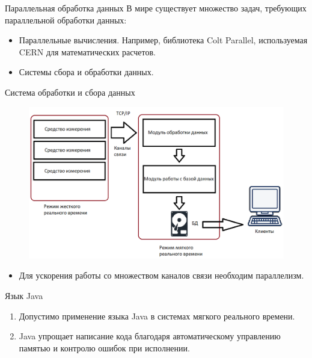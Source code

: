 
{
\begin{frame}[noframenumbering]
		\titlepage
\end{frame}
}

\begin{frame}{Параллельная обработка данных}
	В мире существует множество задач, требующих параллельной обработки данных:
	\begin{itemize}
		\item Параллельные вычисления. Например, библиотека Colt Parallel, используемая CERN для математических расчетов.
		\item Системы сбора и обработки данных.
	\end{itemize}
\end{frame}

\begin{frame}{Система обработки и сбора данных}
	\begin{figure}
		\includegraphics[width=0.9\linewidth]{images/system.png}
	\end{figure}
	\begin{itemize}
		\item Для ускорения работы со множеством каналов связи необходим параллелизм.
	\end{itemize}
\end{frame}

\begin{frame}{Язык Java}
	\begin{enumerate}
		\item Допустимо применение языка Java в системах мягкого реального времени.
		\item Java упрощает написание кода благодаря автоматическому управлению памятью 
		и контролю ошибок при исполнении. 
\end{enumerate}
\end{frame}

